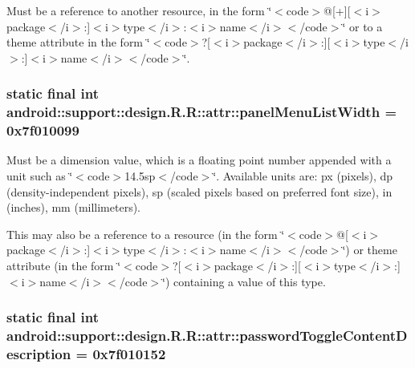 Must be a reference to another resource, in the form \char`\"{}$<$code$>$@\mbox{[}+\mbox{]}\mbox{[}$<$i$>$package$<$/i$>$:\mbox{]}$<$i$>$type$<$/i$>$:$<$i$>$name$<$/i$>$$<$/code$>$\char`\"{} or to a theme attribute in the form \char`\"{}$<$code$>$?\mbox{[}$<$i$>$package$<$/i$>$:\mbox{]}\mbox{[}$<$i$>$type$<$/i$>$:\mbox{]}$<$i$>$name$<$/i$>$$<$/code$>$\char`\"{}. \hypertarget{classandroid_1_1support_1_1design_1_1_r_1_1attr_09a249c44ce310c3d57a24e8afdffca4}{
\subsubsection[{panelMenuListWidth}]{\setlength{\rightskip}{0pt plus 5cm}static final int android::support::design.R.R::attr::panelMenuListWidth = 0x7f010099}}
\label{classandroid_1_1support_1_1design_1_1_r_1_1attr_09a249c44ce310c3d57a24e8afdffca4}


Must be a dimension value, which is a floating point number appended with a unit such as \char`\"{}$<$code$>$14.5sp$<$/code$>$\char`\"{}. Available units are: px (pixels), dp (density-independent pixels), sp (scaled pixels based on preferred font size), in (inches), mm (millimeters). 

This may also be a reference to a resource (in the form \char`\"{}$<$code$>$@\mbox{[}$<$i$>$package$<$/i$>$:\mbox{]}$<$i$>$type$<$/i$>$:$<$i$>$name$<$/i$>$$<$/code$>$\char`\"{}) or theme attribute (in the form \char`\"{}$<$code$>$?\mbox{[}$<$i$>$package$<$/i$>$:\mbox{]}\mbox{[}$<$i$>$type$<$/i$>$:\mbox{]}$<$i$>$name$<$/i$>$$<$/code$>$\char`\"{}) containing a value of this type. \hypertarget{classandroid_1_1support_1_1design_1_1_r_1_1attr_dc96ca0d27c86890240641e1ca4a776a}{
\subsubsection[{passwordToggleContentDescription}]{\setlength{\rightskip}{0pt plus 5cm}static final int android::support::design.R.R::attr::passwordToggleContentDescription = 0x7f010152}}
\label{classandroid_1_1support_1_1design_1_1_r_1_1attr_dc96ca0d27c86890240641e1ca4a776a}


